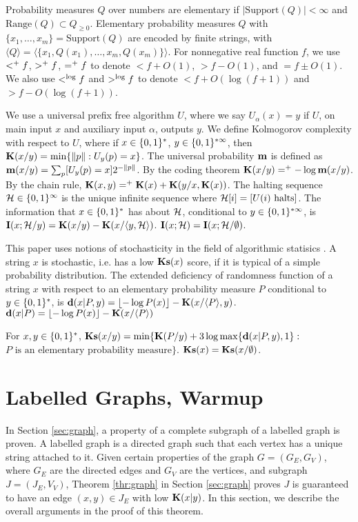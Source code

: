 \documentclass[11pt]{article}\textwidth 6.5in\textheight 9in
\begin{document}
Probability measures $Q$ over numbers are elementary if $|\mathrm{Support}(Q)|<\infty$ and $\mathrm{Range}(Q)\subset Q_{\geq 0}$. Elementary probability measures $Q$ with $\{x_1,\dots,x_m\}=\mathrm{Support}(Q)$ are encoded by finite strings, with $\langle Q\rangle = \langle\{x_1,Q(x_1),\dots,x_m,Q(x_m)\}\rangle$. For nonnegative real function $f$, we use $<^+ f$, $>^+ f$, $=^+ f$ to denote $<f+O(1)$, $>f-O(1)$, and $=f\pm O(1)$. We also use $<^{\log} f$ and $>^{\log} f$ to denote $<f + O(\log (f+1))$ and  $>f - O(\log (f+1))$.

We use a universal prefix free algorithm $U$, where we say $U_\alpha(x)=y$ if $U$, on main input $x$ and auxiliary input $\alpha$, outputs $y$. We define Kolmogorov complexity with respect to $U$, where if $x\in\{0,1\}^*$, $y\in\{0,1\}^{*\infty}$, then ${\mathbf K}(x/y)=\min\{\|p\|:U_y(p)=x\}$. The universal probability ${\mathbf {m}}$ is defined as ${\mathbf {m}}(x/y)=\sum_p[U_y(p)=x]2^{-\|p\|}$. By the coding theorem ${\mathbf K}(x/y)=^+-\log{\mathbf {m}}(x/y)$. By the chain rule, ${\mathbf K}(x,y)=^+{\mathbf K}(x)+{\mathbf K}(y/x,{\mathbf K}(x))$. The halting sequence ${\mathcal H}\in\{0,1\}^\infty$ is the unique infinite sequence where ${\mathcal H}[i]=[U(i)\textrm{ halts}]$. The information that $x\in\{0,1\}^*$ has about ${\mathcal H}$, conditional to $y\in\{0,1\}^{*\infty}$, is ${\mathbf I}(x;{\mathcal H}/y)={\mathbf K}(x/y)-{\mathbf K}(x/\langle y,{\mathcal H}\rangle)$. ${\mathbf I}(x;{\mathcal H})={\mathbf I}(x;{\mathcal H}/\emptyset)$.
 
This paper uses notions of stochasticity in the field of algorithmic statisics \citep{VereshchaginSh17}. A string $x$ is stochastic, i.e. has a low $\mathbf{Ks}(x)$ score, if it is typical of a simple probability distribution. The extended deficiency of randomness function of a string $x$ with respect to an elementary probability measure $P$ conditional to $y\in\{0,1\}^*$, is ${\mathbf d}(x|P,y)={\lfloor-\log P(x)\rfloor}-{\mathbf K}(x/\langle P\rangle,y)$. ${\mathbf d}(x|P) = {\lfloor-\log P(x)\rfloor}-{\mathbf K}(x/\langle P\rangle)$ 
 \begin{dff}[Stochasticity]
 	For $x,y\in\{0,1\}^*$,  $\mathbf{Ks}(x/y)=\min \{{\mathbf K}(P/y)+3\log \max\{{\mathbf d}(x|P,y),1\}:$ $ P\textrm { is an elementary probability measure}\}$. $\mathbf{Ks}(x) = \mathbf{Ks}(x/\emptyset)$.
 \end{dff}
\section{Labelled Graphs, Warmup}
In Section \ref{sec:graph}, a property of a complete subgraph of a labelled graph is proven. A labelled graph is a directed graph such that each vertex has a unique string attached to it. Given certain properties of the graph $G=(G_E,G_V)$, where $G_E$ are the directed edges and $G_V$ are the vertices, and subgraph $J=(J_E,V_V)$, Theorem \ref{thr:graph} in Section \ref{sec:graph} proves $J$ is guaranteed to have an edge $(x,y)\in J_E$ with low ${\mathbf K}(x|y)$. In this section, we describe the overall arguments in the proof of this theorem.
\end{document}
